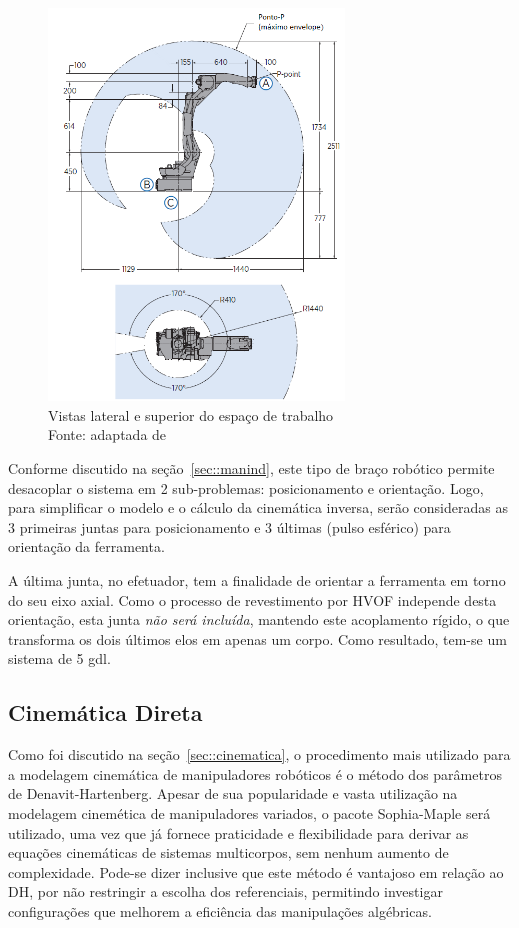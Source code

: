 \begin{figure}[h]
	\centering 
 	\includegraphics[width=0.7\textwidth]{figs/workspace}
 	\caption[Vistas lateral e superior do espaço de trabalho]{Vistas lateral e
 	superior do espaço de trabalho \\Fonte: adaptada de~\cite{manualmh12}}
 	\label{fig::workspace}
\end{figure}

Conforme discutido na seção~\ref{sec::manind}, este tipo de braço robótico
permite desacoplar o sistema em 2 sub-problemas: posicionamento e orientação.
Logo, para simplificar o modelo e o cálculo da cinemática inversa, serão consideradas
as 3 primeiras juntas para posicionamento e 3 últimas (pulso esférico) para
orientação da ferramenta.

A última junta, no efetuador, tem a finalidade de orientar a ferramenta em torno
do seu eixo axial. Como o processo de revestimento por HVOF independe desta
orientação, esta junta \emph{não será incluída}, mantendo este acoplamento
rígido, o que transforma os dois últimos elos em apenas um corpo.
Como resultado, tem-se um sistema de 5 gdl.


\subsection{Cinemática Direta}\label{sec::dkin}

Como foi discutido na seção~\ref{sec::cinematica}, o procedimento mais utilizado
para a modelagem cinemática de manipuladores robóticos é o método dos parâmetros
de Denavit-Hartenberg. Apesar de sua popularidade e vasta utilização na
modelagem cinemética de manipuladores variados, o pacote Sophia-Maple será
utilizado, uma vez que já fornece praticidade e flexibilidade para derivar as
equações cinemáticas de sistemas multicorpos, sem nenhum aumento de
complexidade. Pode-se dizer inclusive que este método é vantajoso em relação ao
DH, por não restringir a escolha dos referenciais, permitindo investigar
configurações que melhorem a eficiência das manipulações algébricas.

